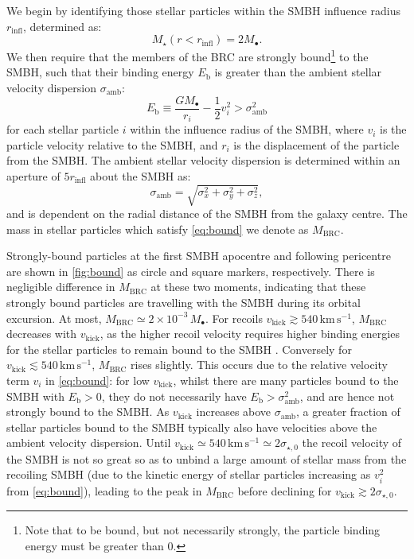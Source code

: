 \documentclass[twocolumn]{aastex631}
\newcommand{\kmps}{\ensuremath{\mathrm{km}\,\mathrm{s}^{-1}} }%
\newcommand{\vk}{\ensuremath{v_\mathrm{kick}}}                %
\newcommand{\sigcore}{\ensuremath{\sigma_{\star,0}}}          %
\newcommand{\mbound}{\ensuremath{M_\mathrm{BRC}}}           %
\begin{document}
We begin by identifying those stellar particles within the SMBH influence radius $r_\mathrm{infl}$, determined as:
\begin{equation}
    M_\star(r < r_\mathrm{infl}) = 2 M_\bullet.
\end{equation}
We then require that the members of the BRC are strongly bound\footnote{Note that to be bound, but not necessarily strongly, the particle binding energy must be greater than 0.} to the SMBH, such that their binding energy $E_\mathrm{b}$ is greater than the ambient stellar velocity dispersion $\sigma_\mathrm{amb}$:
\begin{equation}\label{eq:bound}
    E_\mathrm{b} \equiv \frac{GM_\bullet}{r_i} - \frac{1}{2} v_i^2 > \sigma_\mathrm{amb}^2
\end{equation}
for each stellar particle $i$ within the influence radius of the SMBH, where $v_i$ is the particle velocity relative to the SMBH, and $r_i$ is the displacement of the particle from the SMBH.
The ambient stellar velocity dispersion is determined within an aperture of $5r_\mathrm{infl}$ about the SMBH as:
\begin{equation}
    \sigma_\mathrm{amb} = \sqrt{\sigma_x^2 + \sigma_y^2 + \sigma_z^2},
\end{equation}
and is dependent on the radial distance of the SMBH from the galaxy centre.
The mass in stellar particles which satisfy \autoref{eq:bound} we denote as $\mbound$.

Strongly-bound particles at the first SMBH apocentre and following pericentre are shown in \autoref{fig:bound} as circle and square markers, respectively.
There is negligible difference in $\mbound$ at these two moments, indicating that these strongly bound particles are travelling with the SMBH during its orbital excursion.
At most, $\mbound\simeq 2\times10^{-3}\,M_\bullet$.
For recoils $\vk\gtrsim 540\,\kmps$, $\mbound$ decreases with $\vk$, as the higher recoil velocity requires higher binding energies for the stellar particles to remain bound to the SMBH \citep[see also][]{merritt2009}.
Conversely for $\vk\lesssim 540\,\kmps$, $\mbound$ rises slightly.
This occurs due to the relative velocity term $v_i$ in \autoref{eq:bound}: for low $\vk$, whilst there are many particles bound to the SMBH with $E_\mathrm{b}>0$, they do not necessarily have $E_\mathrm{b}>\sigma_\mathrm{amb}^2$, and are hence not strongly bound to the SMBH.
As $\vk$ increases above $\sigma_\mathrm{amb}$, a greater fraction of stellar particles bound to the SMBH typically also have  velocities above the ambient velocity dispersion.
Until $\vk\simeq 540\,\kmps \simeq 2\sigcore$ the recoil velocity of the SMBH is not so great so as to unbind a large amount of stellar mass from the recoiling SMBH (due to the kinetic energy of stellar particles increasing as $v_i^2$ from \autoref{eq:bound}), leading to the peak in $\mbound$ before declining for $\vk\gtrsim 2\sigcore$.
\end{document}
